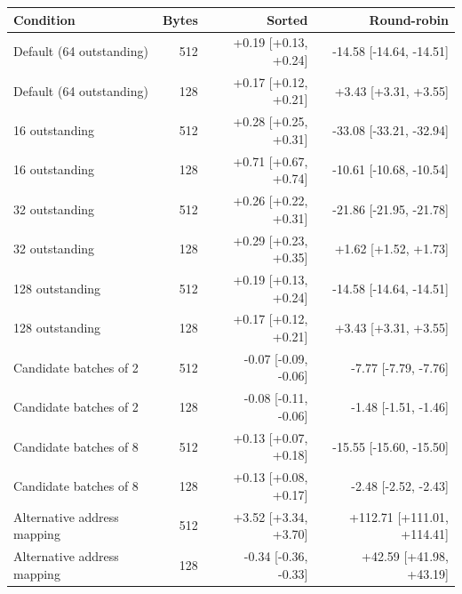 \begin{tabular}{lrrr}
\toprule
Condition & Bytes & Sorted & Round-robin \\
\midrule
Default (64 outstanding) & 512 & +0.19 [+0.13, +0.24] & -14.58 [-14.64, -14.51] \\
Default (64 outstanding) & 128 & +0.17 [+0.12, +0.21] & +3.43 [+3.31, +3.55] \\
16 outstanding & 512 & +0.28 [+0.25, +0.31] & -33.08 [-33.21, -32.94] \\
16 outstanding & 128 & +0.71 [+0.67, +0.74] & -10.61 [-10.68, -10.54] \\
32 outstanding & 512 & +0.26 [+0.22, +0.31] & -21.86 [-21.95, -21.78] \\
32 outstanding & 128 & +0.29 [+0.23, +0.35] & +1.62 [+1.52, +1.73] \\
128 outstanding & 512 & +0.19 [+0.13, +0.24] & -14.58 [-14.64, -14.51] \\
128 outstanding & 128 & +0.17 [+0.12, +0.21] & +3.43 [+3.31, +3.55] \\
Candidate batches of 2 & 512 & -0.07 [-0.09, -0.06] & -7.77 [-7.79, -7.76] \\
Candidate batches of 2 & 128 & -0.08 [-0.11, -0.06] & -1.48 [-1.51, -1.46] \\
Candidate batches of 8 & 512 & +0.13 [+0.07, +0.18] & -15.55 [-15.60, -15.50] \\
Candidate batches of 8 & 128 & +0.13 [+0.08, +0.17] & -2.48 [-2.52, -2.43] \\
Alternative address mapping & 512 & +3.52 [+3.34, +3.70] & +112.71 [+111.01, +114.41] \\
Alternative address mapping & 128 & -0.34 [-0.36, -0.33] & +42.59 [+41.98, +43.19] \\
\bottomrule
\end{tabular}
